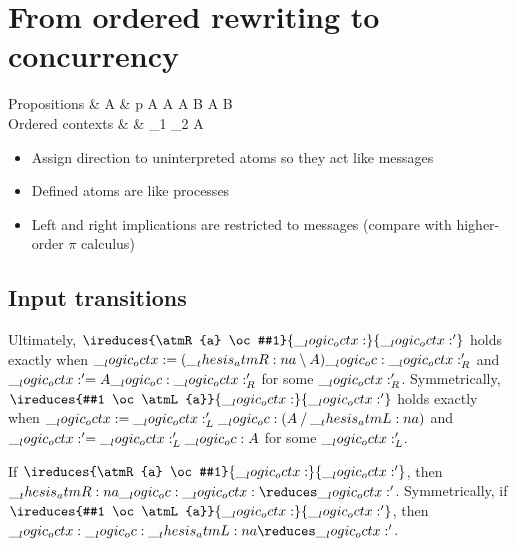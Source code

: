 \chapter{From ordered rewriting to concurrency}\label{ch:ordered-bisimilarity}

\begin{syntax*}
  Propositions &
    A & p \mid {} \mid {}
          \mid {} \limp A \mid A \pmir {}
          \mid A \fuse B \mid \one
          \mid A \with B \mid \top
  \\
  Ordered contexts & 
    \octx & \octxe \mid \octx_1 \oc \octx_2 \mid A
\end{syntax*}

\begin{itemize}
\item Assign direction to uninterpreted atoms so they act like messages
\item Defined atoms are like processes
\item Left and right implications are restricted to messages (compare with higher-order $\pi$ calculus)
\end{itemize}

\section{Input transitions}

Ultimately, $\ireduces{\atmR{a} \oc #1}{\octx}{\octx'}$ holds exactly when $\__logic_octx: = (\__thesis_atmR:n {a} \mathbin { \setminus } A) \__logic_oc: \__logic_octx:'_R$ and $\__logic_octx:' = A \__logic_oc: \__logic_octx:'_R$ for some $\__logic_octx:'_R$.
Symmetrically, $\ireduces{#1 \oc \atmL{a}}{\octx}{\octx'}$ holds exactly when $\__logic_octx: = \__logic_octx:'_L \__logic_oc: (A \mathbin { / } \__thesis_atmL:n {a})$ and $\__logic_octx:' = \__logic_octx:'_L \__logic_oc: A$ for some $\__logic_octx:'_L$.

\begin{theorem}
  If $\ireduces{\atmR{a} \oc #1}{\octx}{\octx'}$, then $\atmR{a} \oc \octx \reduces \octx'$.
  Symmetrically, if $\ireduces{#1 \oc \atmL{a}}{\octx}{\octx'}$, then $\octx \oc \atmL{a} \reduces \octx'$.
\end{theorem}


